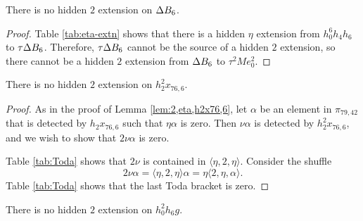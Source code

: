 \begin{lemma}
\label{lem:2-DB6}
There is no hidden $2$ extension on $\Delta B_6$.
\end{lemma}

\begin{proof}
Table \ref{tab:eta-extn} shows that there is a hidden $\eta$ extension
from $h_0^6 h_4 h_6$ to $\tau \Delta B_6$.
Therefore, $\tau \Delta B_6$ cannot be the source of a hidden $2$
extension, so there cannot be a hidden $2$ extension
from $\Delta B_6$ to $\tau^2 M e_0^2$.
\end{proof}


\begin{lemma}
\label{lem:2-h2^2x76,6}
There is no hidden $2$ extension on $h_2^2 x_{76,6}$.
\end{lemma}

\begin{proof}
As in the proof of Lemma \ref{lem:2,eta,h2x76,6},
let $\alpha$ be an element in $\pi_{79,42}$ that is detected by
$h_2 x_{76,6}$ such that $\eta \alpha$ is zero.
Then $\nu \alpha$ is detected by $h_2^2 x_{76,6}$, and we wish to show
that $2 \nu \alpha$ is zero.

Table \ref{tab:Toda} shows that $2 \nu$ is contained in
$\langle \eta, 2, \eta \rangle$.
Consider the shuffle
\[
2 \nu \alpha = \langle \eta, 2, \eta \rangle \alpha =
\eta \langle 2, \eta, \alpha \rangle.
\]
Table \ref{tab:Toda} shows that the last Toda bracket is zero.
\end{proof}

\begin{lemma}
\label{lem:2-h0^2h6g}
There is no hidden $2$ extension on $h_0^2 h_6 g$.
\end{lemma}

